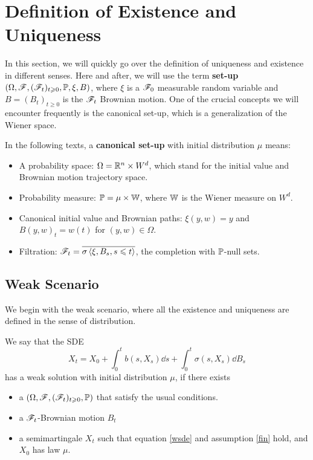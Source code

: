 \documentclass[8pt,onesided]{article}
\begin{document}
\section{Definition of Existence and Uniqueness}

In this section, we will quickly go over the definition of uniqueness and existence in different senses. Here and after, we will use the term \textbf{set-up} $(\Omega, \mathscr{F} ,(\mathscr{F}_t)_{t\geqslant 0},\mathbb{P}, \xi, B)$, where $\xi$ is a $\mathscr{F}_0$ measurable random variable and $B=(B_t)_{t\ge 0}$ is the $\mathscr{F}_t$ Brownian motion. One of the crucial concepts we will encounter frequently is the canonical set-up, which is a generalization of the Wiener space.

\begin{definition}
 In the following texts, a \textbf{canonical set-up} with initial distribution $\mu$ means:
\begin{itemize}
    \item A probability space: $\Omega=\mathbb{R}^n\times W^d$, which stand for the initial value and Brownian motion trajectory space.
    \item Probability measure: $ \mathbb{P}=\mu \times \mathbb{W}$, where $\mathbb{W}$ is the Wiener measure on $W^d$.
    \item Canonical initial value and Brownian paths: $\xi(y,w)=y$ and $B(y,w)_t=w(t)$ for $(y,w)\in \Omega$.
    \item Filtration: $\mathscr{F}_t=\overline{\sigma\left\langle \xi,B_s, s\leqslant t\right\rangle}$, the completion with $\mathbb{P}$-null sets.
\end{itemize}
\end{definition}

\subsection{Weak Scenario}

We begin with the weak scenario, where all the existence and uniqueness are defined in the sense of distribution.

\begin{definition} 
 We say that the SDE
\begin{equation}
    \label{wsde}
    X_t=X_0+\int_0^t b(s,X_s) \dd s+\int_0^t \sigma(s,X_s) \dd B_s
\end{equation}
has a weak solution with initial distribution $\mu$, if there exists
\begin{itemize}
    \item a $(\Omega, \mathscr{F} ,(\mathscr{F}_t)_{t\geqslant 0},\mathbb{P})$ that satisfy the usual conditions.
    \item a $\mathscr{F}_t$-Brownian motion $B_t$ 
    \item a semimartingale $X_t$ such that equation \ref{wsde} and assumption \ref{fin} hold, and $X_0$ has law $\mu$.
\end{itemize}
\end{definition}
\end{document}
